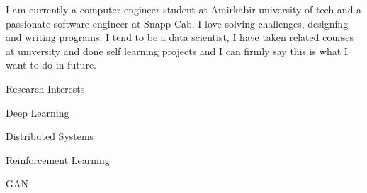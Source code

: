

\begin{cvparagraph}
I am currently a computer engineer student at Amirkabir university of tech and a passionate software engineer at Snapp Cab. I love solving challenges, designing and writing programs. I tend to be a data scientist, I have taken related courses at university and done self learning projects and I can firmly say this is what I want to do in future.

\vspace{5mm}

  \cventry
    {}
    {Research Interests}
    {}
    {}
    {
      \begin{cvitems}
        \item {Deep Learning}
        \item {Distributed Systems}
        \item {Reinforcement Learning}
        \item {GAN}
      \end{cvitems}
    }

\end{cvparagraph}
